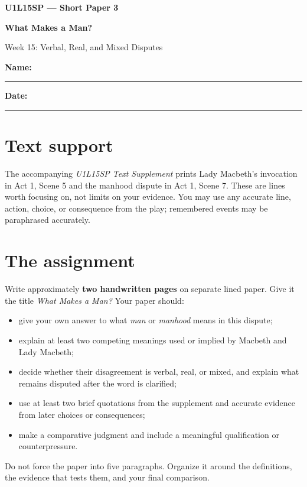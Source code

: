 \documentclass[11pt]{article}
\newcommand{\smallblank}{\rule{0.43\linewidth}{0.4pt}}
\begin{document}
\begin{center}
{\Large\bfseries U1L15SP --- Short Paper 3}\par
{\LARGE\bfseries What Makes a Man?}\par
{\large Week 15: Verbal, Real, and Mixed Disputes}
\end{center}
\noindent\textbf{Name:} \smallblank\hfill
\textbf{Date:} \rule{1.35in}{0.4pt}

\begingroup\small
\vspace{0.2em}

\section*{Text support}
The accompanying \textit{U1L15SP Text Supplement} prints Lady Macbeth's invocation in Act 1, Scene 5 and the manhood dispute in Act 1, Scene 7. These are lines worth focusing on, not limits on your evidence. You may use any accurate line, action, choice, or consequence from the play; remembered events may be paraphrased accurately.

\section*{The assignment}
Write approximately \textbf{two handwritten pages} on separate lined paper. Give it the title \textit{What Makes a Man?} Your paper should:
\begin{itemize}
\item give your own answer to what \emph{man} or \emph{manhood} means in this dispute;
\item explain at least two competing meanings used or implied by Macbeth and Lady Macbeth;
\item decide whether their disagreement is verbal, real, or mixed, and explain what remains disputed after the word is clarified;
\item use at least two brief quotations from the supplement and accurate evidence from later choices or consequences;
\item make a comparative judgment and include a meaningful qualification or counterpressure.
\end{itemize}
Do not force the paper into five paragraphs. Organize it around the definitions, the evidence that tests them, and your final comparison.
\end{document}
